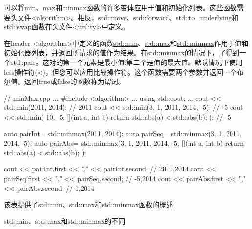 可以将min、max和minmax函数的许多变体应用于值和初始化列表。这些函数需要头文件<algorithm>。相反，std::move、std::forward、std::to\_underlying和std::swap函数在头文件<utility>中定义。


在header <algorithm>中定义的函数\href{http://en.cppreference.com/w/cpp/algorithm/min}{std::min}、\href{http://en.cppreference.com/w/cpp/algorithm/max}{std::max}和\href{http://en.cppreference.com/w/cpp/algorithm/minmax}{std::minmax}作用于值和初始化器列表，并返回所请求的值作为结果。在std::minmax的情况下，了得到一个std::pair。这对的第一个元素是最小值;第二个是值的最大值。默认情况下使用less操作符(<)，但您可以应用比较操作符。这个函数需要两个参数并返回一个布尔值。返回true或false的函数称为谓词。


\begin{cpp}
// minMax.cpp
...
#include <algorithm>
...
using std::cout;
...
cout << std::min(2011, 2014); // 2011
cout << std::min({3, 1, 2011, 2014, -5}); // -5
cout << std::min(-10, -5, [](int a, int b)
                { return std::abs(a) < std::abs(b); }); // -5

auto pairInt= std::minmax(2011, 2014);
auto pairSeq= std::minmax({3, 1, 2011, 2014, -5});
auto pairAbs= std::minmax({3, 1, 2011, 2014, -5}, [](int a, int b)
                      { return std::abs(a) < std::abs(b); });

cout << pairInt.first << "," << pairInt.second; // 2011,2014
cout << pairSeq.first << "," << pairSeq.second; // -5,2014
cout << pairAbs.first << "," << pairAbs.second; // 1,2014
\end{cpp}

该表提供了std::min、std::max和std::minmax函数的概述

\begin{center}
std::min、std::max和std::minmax的不同
\end{center}

